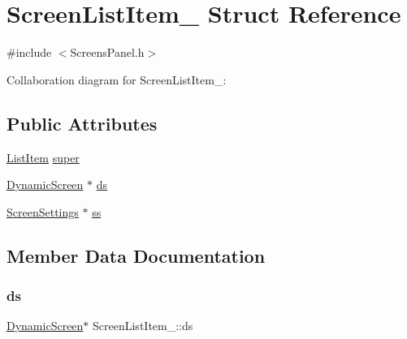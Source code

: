 \hypertarget{structScreenListItem__}{}\section{Screen\+List\+Item\+\_\+ Struct Reference}
\label{structScreenListItem__}


{\ttfamily \#include $<$Screens\+Panel.\+h$>$}



Collaboration diagram for Screen\+List\+Item\+\_\+\+:
\subsection*{Public Attributes}
\begin{DoxyCompactItemize}
\item 
\hyperlink{ListItem_8h_a311dfe5c572117175446997a9e6f15b8}{List\+Item} \hyperlink{structScreenListItem___a7e800dd530c06c4646ffc77ec727752c}{super}
\item 
\hyperlink{DynamicScreen_8h_a9b10b5a0b32fbb6fe6af7f0571ae6b25}{Dynamic\+Screen} $\ast$ \hyperlink{structScreenListItem___a0336d14d829784b815421168a4e96f80}{ds}
\item 
\hyperlink{Settings_8h_a86d3dc963e563d775d50b8cc2b77afb8}{Screen\+Settings} $\ast$ \hyperlink{structScreenListItem___a2219e5de4e353c969f9ea671f8b956a0}{ss}
\end{DoxyCompactItemize}


\subsection{Member Data Documentation}
\mbox{\label{structScreenListItem___a0336d14d829784b815421168a4e96f80}} 
\subsubsection{\texorpdfstring{ds}{ds}}
{\footnotesize\ttfamily \hyperlink{DynamicScreen_8h_a9b10b5a0b32fbb6fe6af7f0571ae6b25}{Dynamic\+Screen}$\ast$ Screen\+List\+Item\+\_\+\+::ds}

\mbox{\label{structScreenListItem___a2219e5de4e353c969f9ea671f8b956a0}} 
